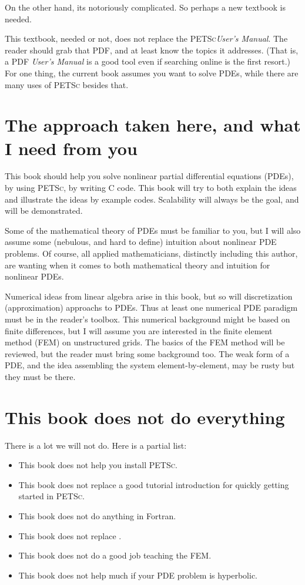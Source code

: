 \documentclass{tufte-book}
\newcommand{\PETSc}{\textsc{PETSc}\xspace}
\begin{document}
On the other hand, its notoriously complicated.  So perhaps a new textbook is needed.

This textbook, needed or not, does not replace the \PETSc \emph{User's Manual}.  The reader should grab that PDF, and at least know the topics it addresses.  (That is, a PDF \emph{User's Manual} is a good tool even if searching online is the first resort.)  For one thing, the current book assumes you want to solve PDEs, while there are many uses of \PETSc besides that.

\section{The approach taken here, and what I need from you}  This book should help you solve nonlinear partial differential equations (PDEs), by using \PETSc, by writing C code.  This book will try to both explain the ideas and illustrate the ideas by example codes.  Scalability will always be the goal, and will be demonstrated.

Some of the mathematical theory of PDEs must be familiar to you, but I will also assume some (nebulous, and hard to define) intuition about nonlinear PDE problems.  Of course, all applied mathematicians, distinctly including this author, are wanting  when it comes to both mathematical theory and intuition for nonlinear PDEs.

Numerical ideas from linear algebra \citep{TrefethenBau} arise in this book, but so will discretization (approximation) approachs to PDEs.  Thus at least one numerical PDE paradigm must be in the reader's toolbox.  This numerical background might be based on finite differences, but I will assume you are interested in the finite element method (FEM) on unstructured grids.  The basics of the FEM method will be reviewed, but the reader must bring some background too.  The weak form of a PDE, and the idea assembling the system element-by-element, may be rusty but they must be there.


\section{This book does not do everything}  There is a lot we will not do.  Here is a partial list:\begin{itemize}
\item This book does not help you install \PETSc.
\item This book does not replace a good tutorial introduction for quickly getting started in \PETSc.
\item This book does not do anything in Fortran.
\item This book does not replace \citep{Smithetal1996}.
\item This book does not do a good job teaching the FEM.
\item This book does not help much if your PDE problem is hyperbolic.
\end{itemize}
\end{document}
